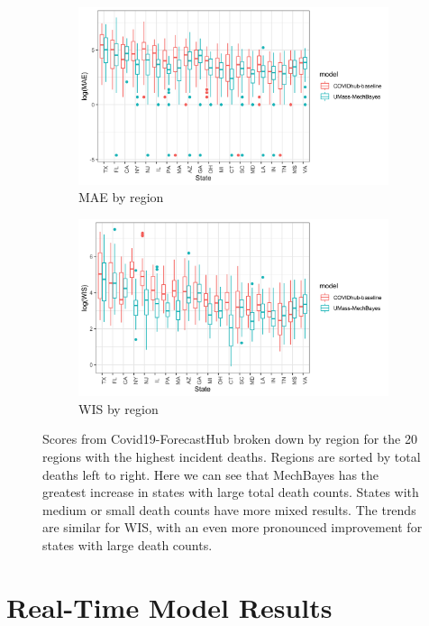 \documentclass[11pt]{amsart}
\begin{document}
\begin{figure}
  \centering

\begin{subfigure}{\textwidth}
  \centering
    \includegraphics[scale=.2]{mae_results_by_region_inc.png}
    \caption{MAE by region}
\end{subfigure}
\begin{subfigure}{\textwidth}
  \centering
    \includegraphics[scale=.20]{wis_results_by_region_inc.png}
    \caption{WIS by region}
\end{subfigure}
\caption{Scores from Covid19-ForecastHub broken down by region for the 20 regions with the highest incident deaths. Regions are sorted by total deaths left to right. Here we can see that MechBayes has the greatest increase in states with large total death counts. States with medium or small death counts have more mixed results. The trends are similar for WIS, with an even more pronounced improvement for states with large death counts. }
\label{fig:covidhub_region_results}
\end{figure}


\section{Real-Time Model Results}
\end{document}
